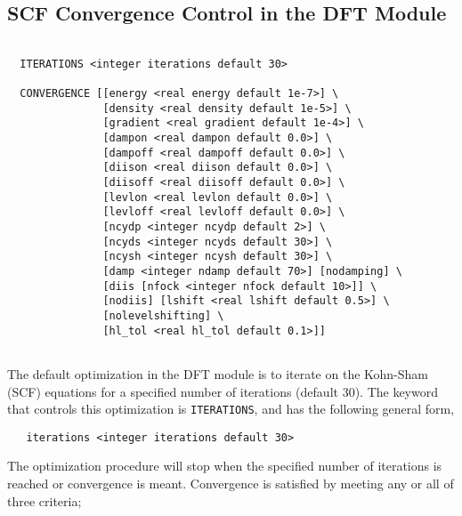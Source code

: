 \subsection{SCF Convergence Control in the DFT Module}
\begin{verbatim}

  ITERATIONS <integer iterations default 30>

  CONVERGENCE [[energy <real energy default 1e-7>] \
               [density <real density default 1e-5>] \
               [gradient <real gradient default 1e-4>] \
               [dampon <real dampon default 0.0>] \
               [dampoff <real dampoff default 0.0>] \
               [diison <real diison default 0.0>] \
               [diisoff <real diisoff default 0.0>] \
               [levlon <real levlon default 0.0>] \
               [levloff <real levloff default 0.0>] \
               [ncydp <integer ncydp default 2>] \
               [ncyds <integer ncyds default 30>] \
               [ncysh <integer ncysh default 30>] \
               [damp <integer ndamp default 70>] [nodamping] \
               [diis [nfock <integer nfock default 10>]] \
               [nodiis] [lshift <real lshift default 0.5>] \
               [nolevelshifting] \
               [hl_tol <real hl_tol default 0.1>]]


\end{verbatim}

The default optimization in the DFT module is to iterate on the 
Kohn-Sham (SCF) equations for a specified number of iterations
(default 30).  The keyword that controls this optimization 
is \verb+ITERATIONS+, and has the following general form,

\begin{verbatim}
   iterations <integer iterations default 30>
\end{verbatim}

The optimization procedure will stop when the specified number of
iterations is reached or convergence is meant.  Convergence is
satisfied by meeting any or all of three criteria; 

